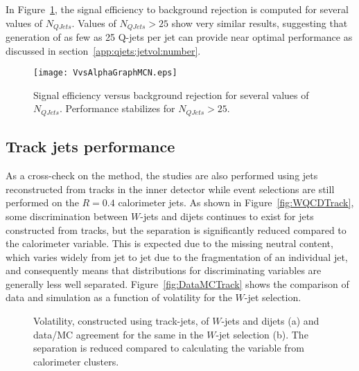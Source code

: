 In Figure~\ref{fig:SEvsBRQ}, the signal efficiency to background rejection is computed for several values of $N_{QJets}$. Values of $N_{QJets} > 25$ show very similar results, suggesting that generation of as few as 25 Q-jets per jet can provide near optimal performance as discussed in section~\ref{app:qjets:jetvol:number}.

\begin{figure}[htbp]
\centering
\texttt{[image: VvsAlphaGraphMCN.eps]}
\caption{Signal efficiency versus background rejection for several values of $N_{QJets}$. Performance stabilizes for $N_{QJets} > 25$.}%
\label{fig:SEvsBRQ}
\end{figure}

\subsection{Track jets performance}
\label{app:qjets:jetvol:trackjets}

As a cross-check on the method, the studies are also performed using jets reconstructed from tracks in the inner detector while event selections are still performed on the $R=0.4$ calorimeter jets. As shown in Figure~\ref{fig:WQCDTrack}, some discrimination between $W$-jets and dijets continues to exist for jets constructed from tracks, but the separation is significantly reduced compared to the calorimeter variable. This is expected due to the missing neutral content, which varies widely from jet to jet due to the fragmentation of an individual jet, and consequently means that distributions for discriminating variables are generally less well separated. Figure~\ref{fig:DataMCTrack} shows the comparison of data and simulation as a function of volatility for the $W$-jet selection. %

\begin{figure}[htbp]
\centering
\caption{Volatility, constructed using track-jets, of $W$-jets and dijets (a) and data/MC agreement for the same in the $W$-jet selection (b). The separation is reduced compared to calculating the variable from calorimeter clusters.}
\label{fig:tracks}
\end{figure}

